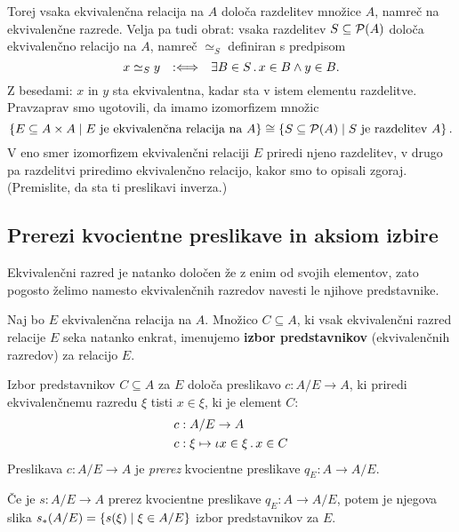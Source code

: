 Torej vsaka ekvivalenčna relacija na $A$ določa razdelitev množice $A$, namreč na
ekvivalenčne razrede. Velja pa tudi obrat: vsaka razdelitev $S \subseteq \mathcal{P}(A)$ določa ekvivalenčno
relacijo na $A$, namreč $\simeq_S$ definiran s predpisom
\begin{equation*}
    x \simeq_S y \quad {{:}{\Longleftrightarrow}}\quad \exists B \in S \,.\, x \in B \land y \in B.
\end{equation*}
%
Z besedami: $x$ in $y$ sta ekvivalentna, kadar sta v istem elementu razdelitve. Pravzaprav
smo ugotovili, da imamo izomorfizem množic
%
\begin{equation*}
  \left\{ E \subseteq A \times A \; \middle| \; \text{$E$ je ekvivalenčna relacija na $A$} \right\} \cong
  \left\{ S \subseteq \mathcal{P}(A) \; \middle| \; \text{$S$ je razdelitev $A$} \right\}.
\end{equation*}
%
V eno smer izomorfizem ekvivalenčni relaciji $E$ priredi njeno razdelitev, v drugo pa razdelitvi priredimo ekvivalenčno
relacijo, kakor smo to opisali zgoraj. (Premislite, da sta ti preslikavi inverza.)


\subsection{Prerezi kvocientne preslikave in aksiom izbire}

Ekvivalenčni razred je natanko določen že z enim od svojih elementov, zato pogosto želimo
namesto ekvivalenčnih razredov navesti le njihove predstavnike.

\begin{definicija}
  Naj bo $E$ ekvivalenčna relacija na $A$. Množico $C \subseteq A$, ki vsak
  ekvivalenčni razred relacije $E$ seka natanko enkrat, imenujemo \textbf{izbor predstavnikov}
  (ekvivalenčnih razredov) za relacijo $E$.
\end{definicija}

Izbor predstavnikov $C \subseteq A$ za $E$ določa preslikavo $c : A/E \to A$, ki priredi
ekvivalenčnemu razredu $\xi$ tisti $x \in \xi$, ki je element $C$:
%
\begin{align*}
  c &: A/E \to A \\
  c &: \xi \mapsto \iota x \in \xi \,.\, x \in C
\end{align*}
%
Preslikava $c : A/E \to A$ je \emph{prerez} kvocientne preslikave $q_E : A \to A/E$.

\begin{izjava}
  Če je $s : A/E \to A$ prerez kvocientne preslikave $q_E : A \to A/E$, potem je
  njegova slika $s_{*}(A/E) = \left\{ s(\xi) \; \middle| \; \xi \in A/E \right\}$ izbor predstavnikov za $E$.
\end{izjava}

